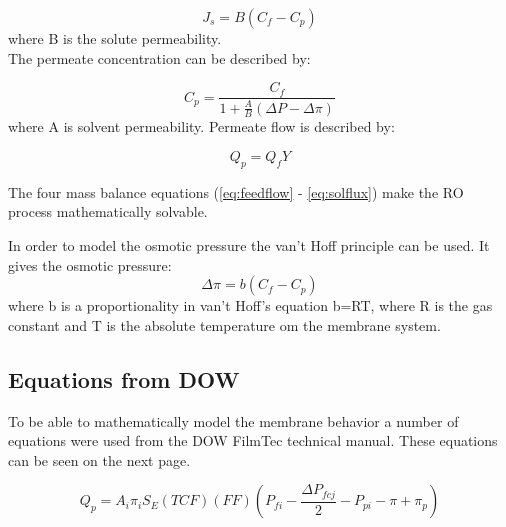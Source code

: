 \begin{equation}
\label{eq:solflux}
J_{s}=B(C_{f}- C_{p})
\end{equation}
 where B is the solute permeability.
\\The permeate concentration can be described by:

\begin{equation}
\label{eq:permcond}
C_{p}=\frac{C_{f}}{1+\frac{A}{B}(\Delta P - \Delta\pi)}
\end{equation}
where A is solvent permeability.
Permeate flow is described by:

\begin{equation}
\label{eq:permflow}
Q_{p}=Q_{f}Y
\end{equation}

The four mass balance equations (\ref{eq:feedflow} - \ref{eq:solflux}) make the RO process mathematically solvable.

In order to model the osmotic pressure the van't Hoff principle can be used. It gives the osmotic pressure:
\begin{equation}
\label{eq:posm}
\Delta\pi=b(C_{f}-C_{p})
\end{equation}
where b is a proportionality in van't Hoff's equation b=RT, where R is the gas constant and T is the absolute temperature om the membrane system. 

\subsection{Equations from DOW}

To be able to mathematically model the membrane behavior a number of equations were used from the DOW FilmTec technical manual. These equations can be seen on the next page.  

\label{sec:doweq}
\mathleft

\begin{equation}
\label{eq:pQ}
Q_{p}=A_{i}\pi_{i} S_{E}(TCF)(FF)(P_{fi}-\frac{\Delta P_{fcj}}{2}-P_{pi}-\pi+\pi_{p})
\end{equation}




